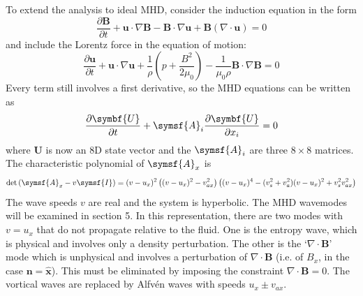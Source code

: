 \documentclass{jknotes}
\newcommand{\B}{\symbf{B}}
\renewcommand{\u}{\symbf{u}}
\begin{document}
To extend the analysis to ideal MHD, consider the induction equation in the
form
\begin{equation}
	\frac{\partial \B}{\partial t} + \u \cdot \nabla \B - \B \cdot \nabla \u +
	\B (\nabla \cdot \u) = 0
\end{equation}
and include the Lorentz force in the equation of motion:
\begin{equation}
	\frac{\partial \u}{\partial t} + \u \cdot \nabla \u +
	\frac{1}{\rho}\left(p + \frac{B^2}{2\mu_0}\right) - \frac{1}{\mu_0 \rho}
		\B \cdot \nabla \B = 0
\end{equation}
Every term still involves a first derivative, so the MHD equations can be
written as
\begin{equation}
	\frac{\partial \symbf{U}}{\partial t} + \symsf{A}_i \frac{\partial
	\symbf{U}}{\partial x_i} = 0 
\end{equation}
where $\symbf{U}$ is now an 8D state vector and the $\symsf{A}_i$ are three
$8\times8$ matrices. The characteristic polynomial of $\symsf{A}_x$ is
\begin{equation}
	\text{det}\left( \symsf{A}_x - v \symsf{I}\right) = (v-u_x)^2 \left(
	(v-u_x)^2 - v_{ax}^2\right)\left( (v-u_x)^4 -
	(v_s^2+v_a^2)(v-u_x)^2 + v_s^2 v_{ax}^2\right)
\end{equation}
The wave speeds $v$ are real and the system is hyperbolic. The MHD wavemodes
will be examined in section 5. In this representation, there are two modes
with $v = u_x$ that do not propagate relative to the fluid. One is the entropy
wave, which is physical and involves only a density perturbation. The other is
the `$\nabla \cdot \B$' mode which is unphysical and involves a perturbation
of $\nabla \cdot \B$ (i.e. of $B_x$, in the case $\symbf{n} =
\hat{\symbf{x}}$). This must be eliminated by imposing the constraint $\nabla
\cdot \B = 0$. The vortical waves are replaced by Alfv\'{e}n waves with speeds
$u_x \pm v_{ax}$.
\end{document}
